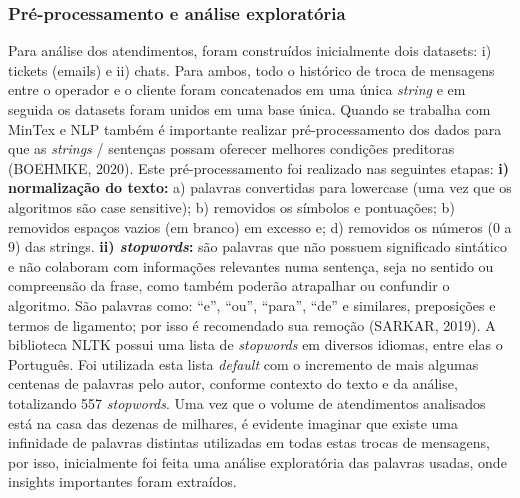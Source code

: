 \documentclass[twocolumn]{rbef}
\newcommand{\1}{\mathbbm{1}}
\begin{document}
\subsubsection{Pré-processamento e análise exploratória} \label{Sessao4.2.1}
Para análise dos atendimentos, foram construídos inicialmente dois datasets: i) tickets (emails) e ii) chats. Para ambos, todo o histórico de troca de mensagens entre o operador e o cliente foram concatenados em uma única \emph{string} e em seguida os datasets foram unidos em uma base única. Quando se trabalha com MinTex e NLP também é importante realizar pré-processamento dos dados para que as \emph{strings} / sentenças possam oferecer melhores condições preditoras (BOEHMKE, 2020)\cite{BOEHMKE}. Este pré-processamento foi realizado nas seguintes etapas:
\newline\linebreak\textbf{i) normalização do texto:} a) palavras convertidas para lowercase (uma vez que os algoritmos são case sensitive); b) removidos os símbolos e pontuações; b) removidos espaços vazios (em branco) em excesso e; d) removidos os números (0 a 9) das strings.
\newline\linebreak\textbf{ii) \emph{stopwords}:} são palavras que não possuem significado sintático e não colaboram com informações relevantes numa sentença, seja no sentido ou compreensão da frase, como também poderão atrapalhar ou confundir o algoritmo. São palavras como: “e”, “ou”, “para”, “de” e similares, preposições e termos de ligamento; por isso é recomendado sua remoção (SARKAR, 2019)\cite{SARKAR}. A biblioteca NLTK possui uma lista de \emph{stopwords} em diversos idiomas, entre elas o Português. Foi utilizada esta lista \emph{default} com o incremento de mais algumas centenas de palavras pelo autor, conforme contexto do texto e da análise, totalizando 557 \emph{stopwords}.
\newline\linebreak Uma vez que o volume de atendimentos analisados está na casa das dezenas de milhares, é evidente imaginar que existe uma infinidade de palavras distintas utilizadas em todas estas trocas de mensagens, por isso, inicialmente foi feita uma análise exploratória das palavras usadas, onde insights importantes foram extraídos.
\end{document}
